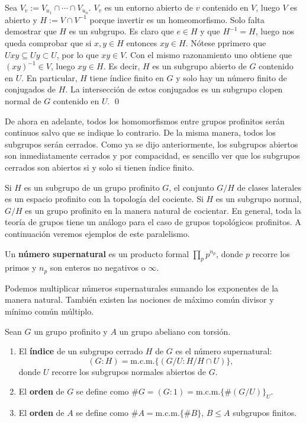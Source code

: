 \documentclass[a4paper,12pt, leqno]{report}
\begin{document}
\begin{dem}
Sea $V_v := V_{u_1}\cap \cdots \cap V_{u_n}$. $V_v$ es un entorno abierto de $v$ contenido en $V$, luego $V$ es abierto y $H:= V \cap V^{-1}$ porque invertir es un homeomorfismo. Solo falta demostrar que $H$ es un subgrupo. Es claro que $e \in H$ y que $H^{-1}=H$, luego nos queda comprobar que si $x,y \in H$ entonces $xy \in H$. Nótese pprimero que $Uxy \subseteq Uy \subset U$, por lo que $xy \in V$. Con el mismo razonamiento uno obtiene que $(xy)^{-1}\in V$, luego $xy \in H$. Es decir, $H$ es un subgrupo abierto de $G$ contenido en $U$. En particular, $H$ tiene índice finito en $G$ y solo hay un número finito de conjugados de $H$. La intersección de estos conjugados es un subgrupo clopen normal de $G$ contenido en $U$. \qed
\end{dem}

De ahora en adelante, todos los homomorfismos entre grupos profinitos serán continuos salvo que se indique lo contrario. De la misma manera, todos los subgrupos serán cerrados. Como ya se dijo anteriormente, los subgrupos abiertos son inmediatamente cerrados y por compacidad, es sencillo ver que los subgrupos cerrados son abiertos si y solo si tienen índice finito. 

Si $H$ es un subgrupo de un grupo profinito $G$, el conjunto $G/H$ de clases laterales es un espacio profinito con la topología del cociente. Si $H$ es un subgrupo normal, $G/H$ es un grupo profinito en la manera natural de cocientar. En general, toda la teoría de grupos tiene un análogo para el caso de grupos topológicos profinitos. A continuación veremos ejemplos de este paralelismo.
\begin{definicion}
	Un \textbf{número supernatural} es un producto formal $\prod\limits_{p}p^{n_p}$, donde $p$ recorre los primos y $n_p$ son enteros no negativos o $\infty$.
\end{definicion}
Podemos multiplicar números supernaturales sumando los exponentes de la manera natural. También existen las nociones de máximo común divisor y mínimo común múltiplo. 
\begin{definicion}
	Sean $G$ un grupo profinito y $A$ un  grupo abeliano con torsión. 
	\begin{enumerate}[label=\roman*)]
		\item El \textbf{índice} de un subgrupo cerrado $H$ de $G$ es el número supernatural:
		\begin{equation*}
		(G:H)=\mathrm{m.c.m.}\{(G/U:H/H\cap U)\},
		\end{equation*}
		donde $U$ recorre los subgrupos normales abiertos de $G$. 
		\item  El \textbf{orden} de $G$ se define como $\#G=(G:1)=\mathrm{m.c.m.}\{\#(G/U)\}_U$. 
		\item El \textbf{orden} de $A$ se define como $\#A=\mathrm{m.c.m.} \{\#B\}$, $B\leq A$ subgrupos finitos.
	\end{enumerate}
\end{definicion}
\end{document}
